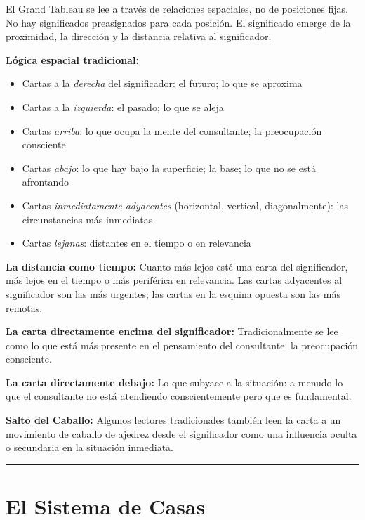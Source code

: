 El Grand Tableau se lee a través de relaciones espaciales, no de posiciones fijas. No hay significados preasignados para cada posición. El significado emerge de la proximidad, la dirección y la distancia relativa al significador.

\textbf{Lógica espacial tradicional:}

\begin{itemize}
\tightlist
\item
  Cartas a la \emph{derecha} del significador: el futuro; lo que se aproxima
\item
  Cartas a la \emph{izquierda}: el pasado; lo que se aleja
\item
  Cartas \emph{arriba}: lo que ocupa la mente del consultante; la preocupación consciente
\item
  Cartas \emph{abajo}: lo que hay bajo la superficie; la base; lo que no se está afrontando
\item
  Cartas \emph{inmediatamente adyacentes} (horizontal, vertical, diagonalmente): las circunstancias más inmediatas
\item
  Cartas \emph{lejanas}: distantes en el tiempo o en relevancia
\end{itemize}

\textbf{La distancia como tiempo:} Cuanto más lejos esté una carta del significador, más lejos en el tiempo o más periférica en relevancia. Las cartas adyacentes al significador son las más urgentes; las cartas en la esquina opuesta son las más remotas.

\textbf{La carta directamente encima del significador:} Tradicionalmente se lee como lo que está más presente en el pensamiento del consultante: la preocupación consciente.

\textbf{La carta directamente debajo:} Lo que subyace a la situación: a menudo lo que el consultante no está atendiendo conscientemente pero que es fundamental.

\textbf{Salto del Caballo:} Algunos lectores tradicionales también leen la carta a un movimiento de caballo de ajedrez desde el significador como una influencia oculta o secundaria en la situación inmediata.

\begin{center}\rule{0.5\linewidth}{0.5pt}\end{center}

\section{El Sistema de Casas}\label{the-house-system}

